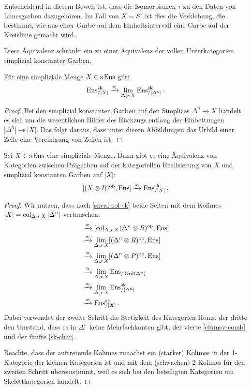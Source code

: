 \begin{bem}
  Entscheidend in diesem Beweis ist, dass die Isomorpismen $\tau$ zu
  den Daten von Limesgarben dazugehören. Im Fall von $X = S^1$ ist
  dies die Verklebung, die bestimmt, wie aus einer Garbe auf dem
  Einheitsintervall eine Garbe auf der Kreislinie gemacht wird.
\end{bem}
Diese Äquivalenz schränkt ein zu einer Äquivalenz der vollen
Unterkategorien simplizial konstanter Garben.
\begin{prop} \label{sheaf-col-sk}
 Für eine simpliziale Menge $X \in \operatorname{s}\operatorname{Ens}$ gilt:
  \[ \operatorname{Ens}_{/|X|}^{\operatorname{sk}} \xrightarrow{\approx} \lim_{\Delta \downarrow \! {\scriptstyle r} \, X} \operatorname{Ens}_{/|\Delta^n|}^{\operatorname{sk}}. \]
\end{prop}
\begin{proof}
  Bei den simplizial konstanten Garben auf den Simplizes $\Delta^n \to
  X$ handelt es sich um die wesentlichen Bilder des Rückzugs entlang
  der Einbettungen $|\Delta^n| \to |X|$. Das folgt daraus, dass unter
  diesen Abbildungen das Urbild einer Zelle eine Vereinigung von
  Zellen ist.
\end{proof}
\begin{theorem} \label{sheaf-sset-sk}
  Sei $X \in \operatorname{s}\operatorname{Ens}$ eine simpliziale Menge. Dann gibt es eine
  Äquivalenz von Kategorien zwischen Prägarben auf der kategoriellen
  Realisierung von $X$ und simplizial konstanten Garben auf $|X|$:
  \[ [(X \otimes R)^\mathrm{op}, \operatorname{Ens}] \xrightarrow{\approx} \operatorname{Ens}^{\operatorname{sk}}_{/|X|} .\]
\end{theorem}
\begin{proof}
  Wir nutzen, dass nach \ref{sheaf-col-sk} beide Seiten mit dem
  Kolimes $|X| = \operatorname{col}_{\Delta \downarrow \! {\scriptstyle r} \, X} |\Delta^n|$
  vertauschen:
  \begin{align*}
    [(X \otimes R)\op, \Ens]
    &\qiso [\col_{\slicecat{\Delta}{r}{X}} (\Delta^n \otimes R)\op, \Ens] \\
    &\qiso \lim_{\slicecat{\Delta}{r}{X}} [(\Delta^n \otimes R)\op, \Ens] \\
    &\qiso \lim_{\slicecat{\Delta}{r}{X}} [(\Delta^n \otimes P)\op, \Ens] \\
    &\qiso \lim_{\slicecat{\Delta}{r}{X}} \Ens_{/\Ord(\Delta^n)} \\
    &\qiso \lim_{\slicecat{\Delta}{r}{X}} \Ens_{/|\Delta^n|}^{\sk} \\
    &\qiso \Ens_{/|X|}^{\sk}.    
  \end{align*}
  Dabei verwendet der zweite Schritt die Stetigkeit des
  Kategorien-Homs, der dritte den Umstand, dass es in $\Delta^n$ keine
  Mehrfachkanten gibt, der vierte \ref{clumsy-comb} und der fünfte
  \ref{sk-char}.

  Beachte, dass der auftretende Kolimes zunächst ein (starker) Kolimes
  in der 1-Kategorie der kleinen Kategorien ist und mit dem
  (schwachen) 2-Kolimes für den zweiten Schritt übereinstimmt, weil es
  sich bei den beteiligten Kategorien um Skelettkategorien handelt.
\end{proof}

